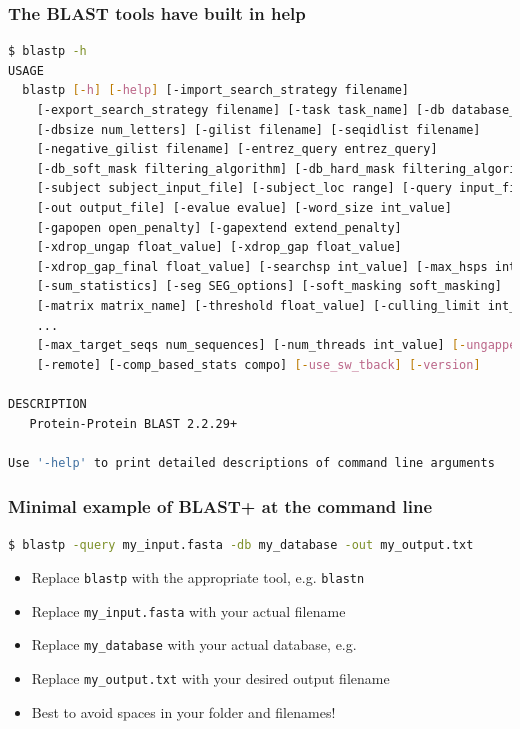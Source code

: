 \documentclass[table]{beamer}
\begin{document}
\begin{frame}[fragile]
\frametitle{The BLAST tools have built in help}
\begin{lstlisting}[language=sh]
$ blastp -h
USAGE
  blastp [-h] [-help] [-import_search_strategy filename]
    [-export_search_strategy filename] [-task task_name] [-db database_name]
    [-dbsize num_letters] [-gilist filename] [-seqidlist filename]
    [-negative_gilist filename] [-entrez_query entrez_query]
    [-db_soft_mask filtering_algorithm] [-db_hard_mask filtering_algorithm]
    [-subject subject_input_file] [-subject_loc range] [-query input_file]
    [-out output_file] [-evalue evalue] [-word_size int_value]
    [-gapopen open_penalty] [-gapextend extend_penalty]
    [-xdrop_ungap float_value] [-xdrop_gap float_value]
    [-xdrop_gap_final float_value] [-searchsp int_value] [-max_hsps int_value]
    [-sum_statistics] [-seg SEG_options] [-soft_masking soft_masking]
    [-matrix matrix_name] [-threshold float_value] [-culling_limit int_value]
    ...
    [-max_target_seqs num_sequences] [-num_threads int_value] [-ungapped]
    [-remote] [-comp_based_stats compo] [-use_sw_tback] [-version]

DESCRIPTION
   Protein-Protein BLAST 2.2.29+

Use '-help' to print detailed descriptions of command line arguments
\end{lstlisting}
\end{frame}


\begin{frame}[fragile]
\frametitle{Minimal example of BLAST+ at the command line}

\begin{lstlisting}[language=sh]
$ blastp -query my_input.fasta -db my_database -out my_output.txt
\end{lstlisting}

\begin{itemize}
\item Replace \texttt{blastp} with the appropriate tool, e.g. \texttt{blastn}
\item Replace \texttt{my\_input.fasta} with your actual filename
\item Replace \texttt{my\_database} with your actual database, e.g. 
\item Replace \texttt{my\_output.txt} with your desired output filename
\item Best to avoid spaces in your folder and filenames!
\end{itemize}

\end{frame}
\end{document}
